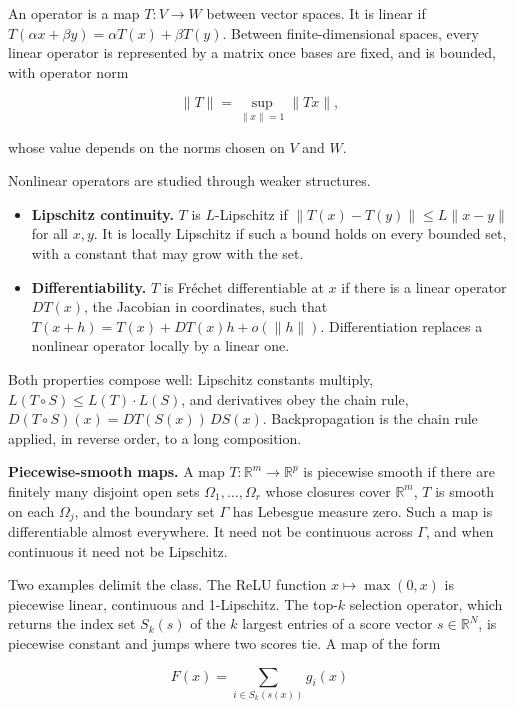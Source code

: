 An operator is a map \(T\colon V \to W\) between vector spaces. It is linear if
\(T(\alpha x + \beta y) = \alpha T(x) + \beta T(y)\). Between finite-dimensional spaces, every
linear operator is represented by a matrix once bases are fixed, and is
bounded, with operator norm

\[
\|T\| = \sup_{\|x\| = 1} \|Tx\|,
\]

whose value depends on the norms chosen on \(V\) and \(W\).

Nonlinear operators are studied through weaker structures.

\begin{itemize}
\tightlist
\item
  \textbf{Lipschitz continuity.} \(T\) is \(L\)-Lipschitz if \(\|T(x) - T(y)\| \le L\|x - y\|\)
  for all \(x, y\). It is locally Lipschitz if such a bound holds on
  every bounded set, with a constant that may grow with the set.
\item
  \textbf{Differentiability.} \(T\) is Fréchet differentiable at \(x\) if there
  is a linear operator \(DT(x)\), the Jacobian in coordinates, such that
  \(T(x + h) = T(x) + DT(x)h + o(\|h\|)\). Differentiation replaces a nonlinear
  operator locally by a linear one.
\end{itemize}

Both properties compose well: Lipschitz constants multiply, \(L(T\circ S) \le
L(T)\cdot L(S)\), and derivatives obey the chain rule, \(D(T\circ S)(x) = DT(S(x))\,
DS(x)\). Backpropagation is the chain rule applied, in reverse order, to a
long composition.

\textbf{Piecewise-smooth maps.} A map \(T\colon \mathbb{R}^{m} \to
\mathbb{R}^{p}\) is piecewise smooth if there are finitely many
disjoint open sets \(\Omega_1, \ldots, \Omega_r\) whose closures cover
\(\mathbb{R}^{m}\), \(T\) is smooth on each \(\Omega_j\), and the boundary set \(\Gamma\) has
Lebesgue measure zero. Such a map is differentiable almost everywhere.
It need not be continuous across \(\Gamma\), and when continuous it need not be
Lipschitz.

Two examples delimit the class. The ReLU function \(x \mapsto \max(0, x)\) is
piecewise linear, continuous and 1-Lipschitz. The top-\(k\) selection
operator, which returns the index set \(S_k(s)\) of the \(k\) largest entries
of a score vector \(s \in \mathbb{R}^{N}\), is piecewise constant and
jumps where two scores tie. A map of the form

\[
F(x) = \sum_{i \in S_k(s(x))} g_i(x)
\]

